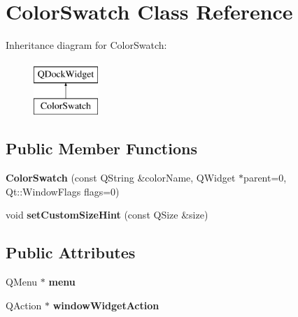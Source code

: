 \hypertarget{class_color_swatch}{\section{Color\-Swatch Class Reference}
\label{class_color_swatch}
}
Inheritance diagram for Color\-Swatch\-:\begin{figure}[H]
\begin{center}
\leavevmode
\includegraphics[height=2.000000cm]{class_color_swatch}
\end{center}
\end{figure}
\subsection*{Public Member Functions}
\begin{DoxyCompactItemize}
\item 
\hypertarget{class_color_swatch_a4e1aff7026fa62412bd35ea588cac508}{{\bfseries Color\-Swatch} (const Q\-String \&color\-Name, Q\-Widget $\ast$parent=0, Qt\-::\-Window\-Flags flags=0)}\label{class_color_swatch_a4e1aff7026fa62412bd35ea588cac508}

\item 
\hypertarget{class_color_swatch_ae967d9f7b8530ac4d07d5ed92e59599f}{void {\bfseries set\-Custom\-Size\-Hint} (const Q\-Size \&size)}\label{class_color_swatch_ae967d9f7b8530ac4d07d5ed92e59599f}

\end{DoxyCompactItemize}
\subsection*{Public Attributes}
\begin{DoxyCompactItemize}
\item 
\hypertarget{class_color_swatch_adeb8cbe648b985bb3231fb25927f8652}{Q\-Menu $\ast$ {\bfseries menu}}\label{class_color_swatch_adeb8cbe648b985bb3231fb25927f8652}

\item 
\hypertarget{class_color_swatch_a753ae92b7193a67376788434e58a3c52}{Q\-Action $\ast$ {\bfseries window\-Widget\-Action}}\label{class_color_swatch_a753ae92b7193a67376788434e58a3c52}

\end{DoxyCompactItemize}
